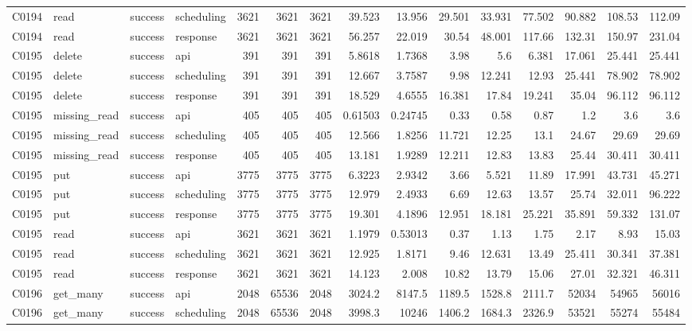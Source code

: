 \begin{landscape}
\begin{longtable}{llllrrrrrrrrrrr}
C0194 & read & success & scheduling & 3621 & 3621 & 3621 & 39.523 & 13.956 & 29.501 & 33.931 & 77.502 & 90.882 & 108.53 & 112.09\\
C0194 & read & success & response & 3621 & 3621 & 3621 & 56.257 & 22.019 & 30.54 & 48.001 & 117.66 & 132.31 & 150.97 & 231.04\\
C0195 & delete & success & api & 391 & 391 & 391 & 5.8618 & 1.7368 & 3.98 & 5.6 & 6.381 & 17.061 & 25.441 & 25.441\\
C0195 & delete & success & scheduling & 391 & 391 & 391 & 12.667 & 3.7587 & 9.98 & 12.241 & 12.93 & 25.441 & 78.902 & 78.902\\
C0195 & delete & success & response & 391 & 391 & 391 & 18.529 & 4.6555 & 16.381 & 17.84 & 19.241 & 35.04 & 96.112 & 96.112\\
C0195 & missing\_\allowbreak{}read & success & api & 405 & 405 & 405 & 0.61503 & 0.24745 & 0.33 & 0.58 & 0.87 & 1.2 & 3.6 & 3.6\\
C0195 & missing\_\allowbreak{}read & success & scheduling & 405 & 405 & 405 & 12.566 & 1.8256 & 11.721 & 12.25 & 13.1 & 24.67 & 29.69 & 29.69\\
C0195 & missing\_\allowbreak{}read & success & response & 405 & 405 & 405 & 13.181 & 1.9289 & 12.211 & 12.83 & 13.83 & 25.44 & 30.411 & 30.411\\
C0195 & put & success & api & 3775 & 3775 & 3775 & 6.3223 & 2.9342 & 3.66 & 5.521 & 11.89 & 17.991 & 43.731 & 45.271\\
C0195 & put & success & scheduling & 3775 & 3775 & 3775 & 12.979 & 2.4933 & 6.69 & 12.63 & 13.57 & 25.74 & 32.011 & 96.222\\
C0195 & put & success & response & 3775 & 3775 & 3775 & 19.301 & 4.1896 & 12.951 & 18.181 & 25.221 & 35.891 & 59.332 & 131.07\\
C0195 & read & success & api & 3621 & 3621 & 3621 & 1.1979 & 0.53013 & 0.37 & 1.13 & 1.75 & 2.17 & 8.93 & 15.03\\
C0195 & read & success & scheduling & 3621 & 3621 & 3621 & 12.925 & 1.8171 & 9.46 & 12.631 & 13.49 & 25.411 & 30.341 & 37.381\\
C0195 & read & success & response & 3621 & 3621 & 3621 & 14.123 & 2.008 & 10.82 & 13.79 & 15.06 & 27.01 & 32.321 & 46.311\\
C0196 & get\_\allowbreak{}many & success & api & 2048 & 65536 & 2048 & 3024.2 & 8147.5 & 1189.5 & 1528.8 & 2111.7 & 52034 & 54965 & 56016\\
C0196 & get\_\allowbreak{}many & success & scheduling & 2048 & 65536 & 2048 & 3998.3 & 10246 & 1406.2 & 1684.3 & 2326.9 & 53521 & 55274 & 55484\\

\end{longtable}
\end{landscape}
